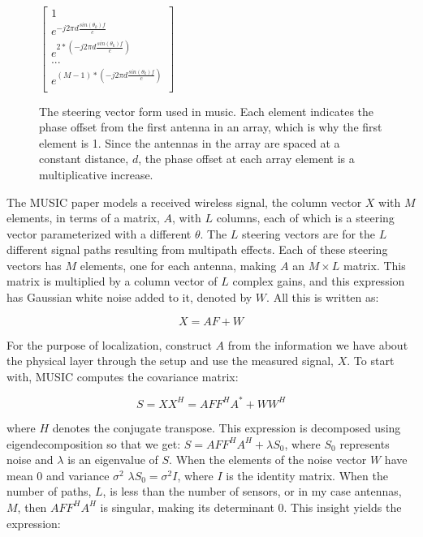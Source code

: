 \documentclass[12pt]{report}
\begin{document}
\begin{figure}[!htb]
    \begin{center}
        \caption{The steering vector form used in music. Each element indicates the phase offset from the first antenna in an array, which is why the first element is 1. Since the antennas in the array are spaced at a constant distance, $d$, the phase offset at each array element is a multiplicative increase.}
        \label{figure: music-steering-vector}
        $\begin{bmatrix}
        1 \\
        e^{-j 2 \pi d \frac{sin(\theta_{k}) f}{c}} \\
        e^{2 * (-j 2 \pi d \frac{sin(\theta_{k}) f}{c})} \\
        ... \\
        e^{(M - 1) * (-j 2 \pi d \frac{sin(\theta_{k}) f}{c})} \\
        \end{bmatrix}$
    \end{center}
\end{figure}

The MUSIC paper models a received wireless signal, the column vector $X$ with $M$ elements, in terms of a matrix, $A$, with $L$ columns, each of which is a steering vector parameterized with a different $\theta$. The $L$ steering vectors are for the $L$ different signal paths resulting from multipath effects. Each of these steering vectors has $M$ elements, one for each antenna, making $A$ an $M \times L$ matrix. This matrix is multiplied by a column vector of $L$ complex gains, and this expression has Gaussian white noise added to it, denoted by $W$. All this is written as:

$$X = AF + W$$

For the purpose of localization, construct $A$ from the information we have about the physical layer through the setup and use the measured signal, $X$. To start with, MUSIC computes the covariance matrix:

$$S = XX^{H} = A FF^{H} A^{*} + WW^{H}$$

where $H$ denotes the conjugate transpose. This expression is decomposed using eigendecomposition so that we get: $S = A FF^{H} A^{H} + \lambda S_{0}$, where $S_{0}$ represents noise and $\lambda$ is an eigenvalue of $S$. When the elements of the noise vector $W$ have mean 0 and variance $\sigma^{2}$ $\lambda S_{0} = \sigma^{2} I$, where $I$ is the identity matrix. When the number of paths, $L$, is less than the number of sensors, or in my case antennas, $M$, then $A FF^{H} A^{H}$ is singular, making its determinant 0. This insight yields the expression:
\end{document}
